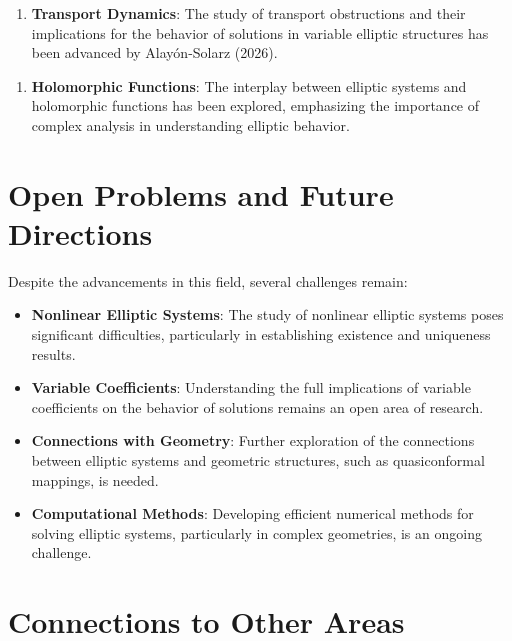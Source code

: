 \documentclass[11pt,a4paper]{article}
\begin{document}
\begin{enumerate}
\item \textbf{Transport Dynamics}: The study of transport obstructions and their implications for the behavior of solutions in variable elliptic structures has been advanced by Alayón-Solarz (2026).
\end{enumerate}

\begin{enumerate}
\item \textbf{Holomorphic Functions}: The interplay between elliptic systems and holomorphic functions has been explored, emphasizing the importance of complex analysis in understanding elliptic behavior.
\end{enumerate}

\section{Open Problems and Future Directions}

Despite the advancements in this field, several challenges remain:

\begin{itemize}
\item \textbf{Nonlinear Elliptic Systems}: The study of nonlinear elliptic systems poses significant difficulties, particularly in establishing existence and uniqueness results.
\end{itemize}

\begin{itemize}
\item \textbf{Variable Coefficients}: Understanding the full implications of variable coefficients on the behavior of solutions remains an open area of research.
\end{itemize}

\begin{itemize}
\item \textbf{Connections with Geometry}: Further exploration of the connections between elliptic systems and geometric structures, such as quasiconformal mappings, is needed.
\end{itemize}

\begin{itemize}
\item \textbf{Computational Methods}: Developing efficient numerical methods for solving elliptic systems, particularly in complex geometries, is an ongoing challenge.
\end{itemize}

\section{Connections to Other Areas}
\end{document}
